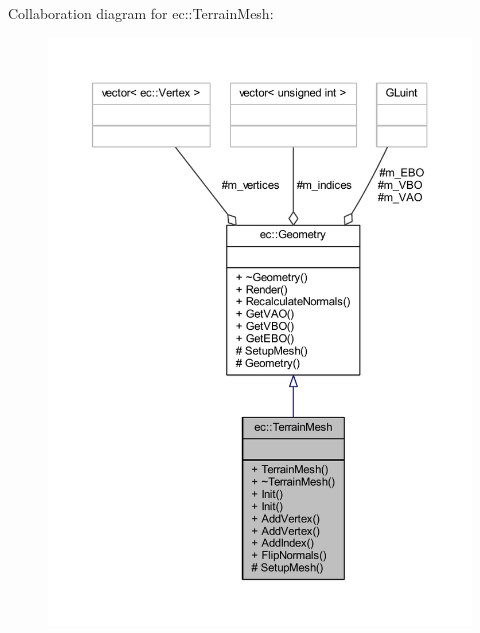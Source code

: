 Collaboration diagram for ec\+:\+:Terrain\+Mesh\+:
\nopagebreak
\begin{figure}[H]
\begin{center}
\leavevmode
\includegraphics[width=350pt]{classec_1_1_terrain_mesh__coll__graph}
\end{center}
\end{figure}
